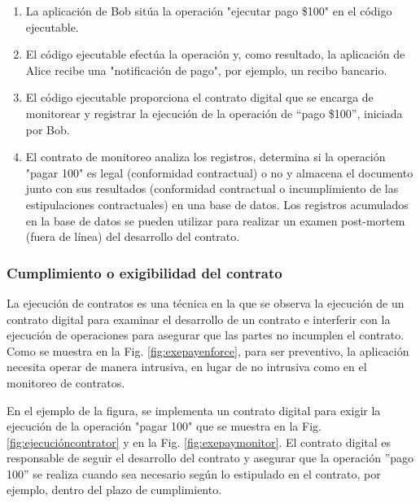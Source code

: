 \documentclass[12pt]{report} %
\begin{document}
 \begin{enumerate}
     \item La aplicación de Bob sitúa la operación "ejecutar pago \$100" en el código ejecutable.

     \item El código ejecutable efectúa la operación y, como resultado, la aplicación de Alice recibe una "notificación de pago", por ejemplo, un recibo bancario.

     \item El código ejecutable proporciona el contrato digital que se encarga de monitorear y registrar la ejecución de la operación de “pago \$100”, iniciada por Bob.

     \item El contrato de monitoreo analiza los registros, determina si la operación "pagar 100" es legal (conformidad contractual) o no y almacena el documento junto con sus resultados (conformidad contractual o incumplimiento de las estipulaciones contractuales) en una base de datos. Los registros acumulados en la base de datos se pueden utilizar para realizar un examen post-mortem (fuera de línea) del desarrollo del contrato.

     \end{enumerate}

     \subsubsection{ Cumplimiento o exigibilidad del contrato}
     \label{cumplimientodelcontrato}

La ejecución de contratos es una técnica en la que se observa la ejecución de un contrato digital para examinar el desarrollo de un contrato e interferir con la ejecución de operaciones para asegurar que las partes no incumplen el contrato. Como se muestra en la Fig. \ref{fig:exepayenforce}, para ser preventivo, la aplicación necesita operar de manera intrusiva, en lugar de no intrusiva como en el monitoreo de contratos.

En el ejemplo de la figura, se implementa un contrato digital para exigir la ejecución de la operación "pagar 100" que se muestra en la Fig. \ref{fig:ejecucióncontrator} y en la Fig. \ref{fig:exepaymonitor}. El contrato digital es responsable de seguir el desarrollo del contrato y asegurar que la operación ”pago 100” se realiza cuando sea necesario según lo estipulado en el contrato, por ejemplo, dentro del plazo de cumplimiento.
\end{document}
